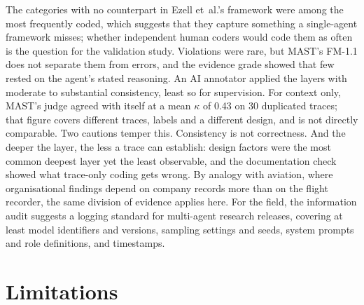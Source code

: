 \documentclass[10pt]{article}
\begin{document}
The categories with no counterpart in Ezell et~al.'s framework were among the
most frequently coded, which suggests that they capture something a single-agent
framework misses; whether independent human coders would code them as often is the
question for the validation study. Violations were rare, but
MAST's FM-1.1 does not separate them from errors, and the evidence grade showed that
few rested on the agent's stated reasoning. An AI annotator applied the layers with moderate to substantial consistency, least so for supervision. For context only, MAST's judge agreed with itself at a mean $\kappa$ of 0.43 on 30 duplicated traces; that figure covers different traces, labels and a different design, and is not directly comparable. Two cautions
temper this. Consistency is not correctness. And the deeper the layer, the less a
trace can establish: design factors were the most common deepest layer yet the
least observable, and the documentation check showed what trace-only coding gets
wrong. By analogy with aviation, where organisational findings depend on company
records more than on the flight recorder, the same division of evidence applies
here. For the field,
the information audit suggests a logging standard for multi-agent research
releases, covering at least model identifiers and versions, sampling settings and
seeds, system prompts and role definitions, and timestamps.

\section{Limitations}
\end{document}
